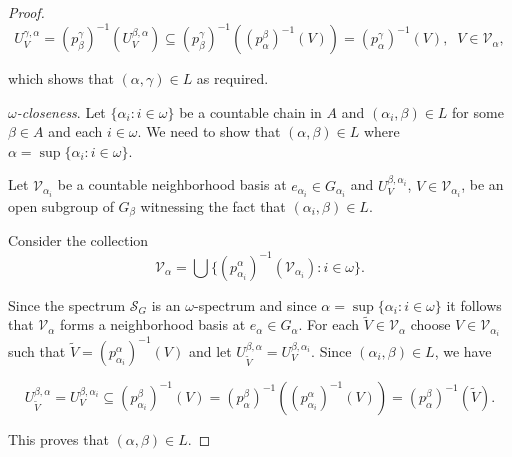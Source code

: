 \documentclass[12pt,draft]{amsart}
\theoremstyle{plain}
\theoremstyle{definition}
\numberwithin{equation}{section}
\begin{document}
\begin{proof}
\[ U_{V}^{\gamma ,\alpha} = \left( p_{\beta}^{\gamma}\right)^{-1}(U_{V}^{\beta ,\alpha})
\subseteq  \left( p_{\beta}^{\gamma}\right)^{-1}\left(\left(
p_{\alpha}^{\beta}\right)^{-1}(V)\right) = 
\left( p_{\alpha}^{\gamma}\right)^{-1}(V) ,\;\; V \in {\mathcal V}_{\alpha} , \]

\noindent which shows that $(\alpha ,\gamma ) \in L$ as required.

{\em $\omega$-closeness}.
Let $\{ \alpha_{i} : i \in \omega \}$
be a countable chain in $A$ and
$(\alpha_{i}, \beta ) \in L$ for some
$\beta \in A$ and each $i \in \omega$. We need to show that
$(\alpha ,\beta ) \in L$ where $\alpha =
\sup \{\alpha_{i} \colon i \in \omega \}$.
 

Let ${\mathcal V}_{\alpha_{i}}$ be a countable
neighborhood basis 
at $e_{\alpha_{i}} \in G_{\alpha_{i}}$ and
$U_{V}^{\beta ,\alpha_{i}}$, $V \in {\mathcal V}_{\alpha_{i}}$,
be an open subgroup of $G_{\beta}$ witnessing the fact that
$(\alpha_{i}, \beta ) \in L$.


Consider the collection 
\[ {\mathcal V}_{\alpha} =
\bigcup\{ \left( p_{\alpha_{i}}^{\alpha}\right)^{-1}\left(
{\mathcal V}_{\alpha_{i}}\right)
\colon i \in \omega\}  .\]

\noindent Since the spectrum ${\mathcal S}_{G}$ is an $\omega$-spectrum and
since $\alpha = \sup\{ \alpha_{i} \colon i \in \omega\}$ it
follows that ${\mathcal V}_{\alpha}$ forms a neighborhood basis
at $e_{\alpha} \in G_{\alpha}$. For each $\widetilde{V} \in {\mathcal V}_{\alpha}$
choose $V \in {\mathcal V}_{\alpha_{i}}$ such that $\widetilde{V} = \left( p_{\alpha_{i}}^{\alpha}\right)^{-1}(V)$ and let $U_{\widetilde{V}}^{\beta ,\alpha} = U_{V}^{\beta ,\alpha_{i}}$. Since $(\alpha_{i} ,\beta) \in L$, we have

\[ U_{\widetilde{V}}^{\beta ,\alpha} = U_{V}^{\beta ,\alpha_{i}} \subseteq \left( p_{\alpha_{i}}^{\beta}\right)^{-1}(V) = \left( p_{\alpha}^{\beta}\right)^{-1}
\left( \left( p_{\alpha_{i}}^{\alpha}\right)^{-1}(V)\right) = \left( p_{\alpha}^{\beta}\right)^{-1}(\widetilde{V}) .\]

\noindent This proves that $(\alpha ,\beta ) \in L$.


\end{proof}
\end{document}
